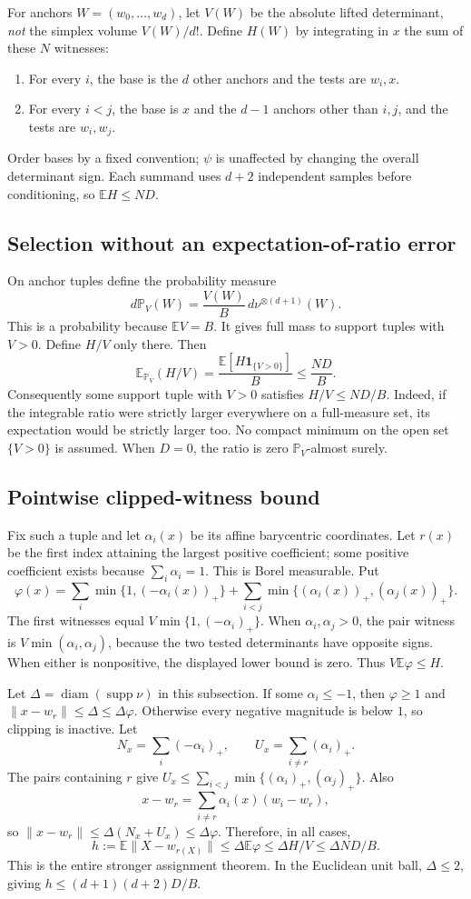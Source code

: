 \documentclass[11pt,letterpaper]{article}
\newcommand{\EE}{\mathbb E}
\newcommand{\PP}{\mathbb P}
\newcommand{\supp}{\operatorname{supp}}
\newcommand{\diam}{\operatorname{diam}}
\newcommand{\pos}[1]{(#1)_+}
\begin{document}
For anchors $W=(w_0,\ldots,w_d)$, let $V(W)$ be the absolute lifted
determinant, \emph{not} the simplex volume $V(W)/d!$. Define $H(W)$ by
integrating in $x$ the sum of these $N$ witnesses:
\begin{enumerate}
\item For every $i$, the base is the $d$ other anchors and the tests are
      $w_i,x$.
\item For every $i<j$, the base is $x$ and the $d-1$ anchors other than
      $i,j$, and the tests are $w_i,w_j$.
\end{enumerate}
Order bases by a fixed convention; $\psi$ is unaffected by changing the
overall determinant sign. Each summand uses $d+2$ independent samples
before conditioning, so $\EE H\le ND$.

\subsection*{Selection without an expectation-of-ratio error}
On anchor tuples define the probability measure
\[
 d\PP_V(W)=\frac{V(W)}B\,d\nu^{\otimes(d+1)}(W).
\]
This is a probability because $\EE V=B$. It gives full mass to support
tuples with $V>0$. Define $H/V$ only there. Then
\[
 \EE_{\PP_V}(H/V)=\frac{\EE[H\mathbf1_{\{V>0\}}]}B\le\frac{ND}B.
\]
Consequently some support tuple with $V>0$ satisfies $H/V\le ND/B$.
Indeed, if the integrable ratio were strictly larger everywhere on a
full-measure set, its expectation would be strictly larger too. No compact
minimum on the open set $\{V>0\}$ is assumed. When $D=0$, the ratio is zero
$\PP_V$-almost surely.

\subsection*{Pointwise clipped-witness bound}
Fix such a tuple and let $\alpha_i(x)$ be its affine barycentric coordinates.
Let $r(x)$ be the first index attaining the largest positive coefficient;
some positive coefficient exists because $\sum_i\alpha_i=1$. This is Borel
measurable. Put
\[
 \varphi(x)=\sum_i\min\{1,\pos{-\alpha_i(x)}\}
       +\sum_{i<j}\min\{\pos{\alpha_i(x)},\pos{\alpha_j(x)}\}.
\]
The first witnesses equal $V\min\{1,\pos{-\alpha_i}\}$. When
$\alpha_i,\alpha_j>0$, the pair witness is $V\min(\alpha_i,\alpha_j)$,
because the two tested determinants have opposite signs. When either is
nonpositive, the displayed lower bound is zero. Thus $V\EE\varphi\le H$.

Let $\Delta=\diam(\supp\nu)$ in this subsection. If some $\alpha_i\le-1$,
then $\varphi\ge1$ and
$\|x-w_r\|\le\Delta\le\Delta\varphi$. Otherwise every negative magnitude
is below $1$, so clipping is inactive. Let
\[
 N_x=\sum_i\pos{-\alpha_i},\qquad U_x=\sum_{i\ne r}\pos{\alpha_i}.
\]
The pairs containing $r$ give
$U_x\le\sum_{i<j}\min\{\pos{\alpha_i},\pos{\alpha_j}\}$. Also
\[
 x-w_r=\sum_{i\ne r}\alpha_i(x)(w_i-w_r),
\]
so $\|x-w_r\|\le\Delta(N_x+U_x)\le\Delta\varphi$. Therefore, in all cases,
\[
 h:=\EE\|X-w_{r(X)}\|
 \le\Delta\EE\varphi\le\Delta H/V\le\Delta ND/B.
\]
This is the entire stronger assignment theorem. In the Euclidean unit
ball, $\Delta\le2$, giving $h\le(d+1)(d+2)D/B$.
\end{document}
